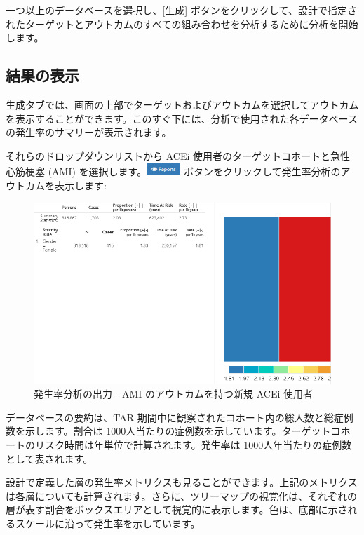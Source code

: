 \documentclass[
  11pt]{book}
\theoremstyle{definition}
\theoremstyle{definition}
\theoremstyle{definition}
\theoremstyle{definition}
\theoremstyle{remark}
\begin{document}
一つ以上のデータベースを選択し、{[}生成{]} ボタンをクリックして、設計で指定されたターゲットとアウトカムのすべての組み合わせを分析するために分析を開始します。

\subsection{結果の表示}\label{ux7d50ux679cux306eux8868ux793a-1}

生成タブでは、画面の上部でターゲットおよびアウトカムを選択してアウトカムを表示することができます。このすぐ下には、分析で使用された各データベースの発生率のサマリーが表示されます。

それらのドロップダウンリストから ACEi 使用者のターゲットコホートと急性心筋梗塞 (AMI) を選択します。\includegraphics{images/Characterization/atlasIncidenceReportButton.png} ボタンをクリックして発生率分析のアウトカムを表示します:

\begin{figure}

{\centering \includegraphics[width=1\linewidth]{images/Characterization/atlasIncidenceResults} 

}

\caption{発生率分析の出力 - AMI のアウトカムを持つ新規 ACEi 使用者}\label{fig:atlasIncidenceResults}
\end{figure}

データベースの要約は、TAR 期間中に観察されたコホート内の総人数と総症例数を示します。割合は 1000人当たりの症例数を示しています。ターゲットコホートのリスク時間は年単位で計算されます。発生率は 1000人年当たりの症例数として表されます。

設計で定義した層の発生率メトリクスも見ることができます。上記のメトリクスは各層についても計算されます。さらに、ツリーマップの視覚化は、それぞれの層が表す割合をボックスエリアとして視覚的に表示します。色は、底部に示されるスケールに沿って発生率を示しています。
\end{document}

